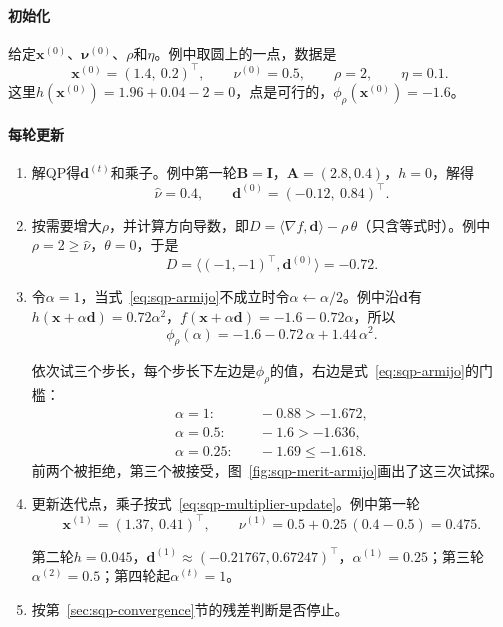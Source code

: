 \paragraph{初始化}
给定$\bm{x}^{(0)}$、$\bm{\nu}^{(0)}$、$\rho$和$\eta$。例中取圆上的一点，数据是
\[
 \bm{x}^{(0)}=(1.4,\ 0.2)^\top,\qquad\nu^{(0)}=0.5,\qquad\rho=2,\qquad\eta=0.1.
\]
这里$h(\bm{x}^{(0)})=1.96+0.04-2=0$，点是可行的，$\phi_\rho(\bm{x}^{(0)})=-1.6$。

\paragraph{每轮更新}
\begin{enumerate}
 \item 解QP得$\bm{d}^{(t)}$和乘子。例中第一轮$\bm{B}=\bm{I}$，$\bm{A}=(2.8,0.4)$，$h=0$，解得
 \[
  \hat\nu=0.4,\qquad\bm{d}^{(0)}=(-0.12,\ 0.84)^\top.
 \]

 \item 按需要增大$\rho$，并计算方向导数，即$D=\langle\nabla f,\bm{d}\rangle-\rho\,\theta$（只含等式时）。例中$\rho=2\geq\hat\nu$，$\theta=0$，于是
 \[
  D=\langle(-1,-1)^\top,\bm{d}^{(0)}\rangle=-0.72.
 \]

 \item 令$\alpha=1$，当式~\eqref{eq:sqp-armijo}不成立时令$\alpha\leftarrow\alpha/2$。例中沿$\bm{d}$有$h(\bm{x}+\alpha\bm{d})=0.72\alpha^2$，$f(\bm{x}+\alpha\bm{d})=-1.6-0.72\alpha$，所以
 \[
  \phi_\rho(\alpha)=-1.6-0.72\,\alpha+1.44\,\alpha^2.
 \]

 依次试三个步长，每个步长下左边是$\phi_\rho$的值，右边是式~\eqref{eq:sqp-armijo}的门槛：
 \[
  \begin{aligned}
  \alpha=1:&\quad-0.88>-1.672,\\
  \alpha=0.5:&\quad-1.6>-1.636,\\
  \alpha=0.25:&\quad-1.69\leq-1.618.
  \end{aligned}
 \]
 前两个被拒绝，第三个被接受，图~\ref{fig:sqp-merit-armijo}画出了这三次试探。

 \item 更新迭代点，乘子按式~\eqref{eq:sqp-multiplier-update}。例中第一轮
 \[
  \bm{x}^{(1)}=(1.37,\ 0.41)^\top,\qquad\nu^{(1)}=0.5+0.25\,(0.4-0.5)=0.475.
 \]

 第二轮$h=0.045$，$\bm{d}^{(1)}\approx(-0.21767,0.67247)^\top$，$\alpha^{(1)}=0.25$；第三轮$\alpha^{(2)}=0.5$；第四轮起$\alpha^{(t)}=1$。

 \item 按第~\ref{sec:sqp-convergence}节的残差判断是否停止。
\end{enumerate}

